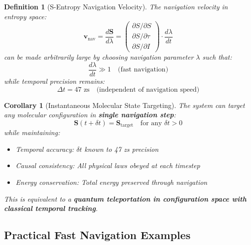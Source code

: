 \documentclass[12pt,a4paper]{article}
\newtheorem{definition}[theorem]{Definition}
\newtheorem{corollary}[theorem]{Corollary}
\begin{document}
\begin{definition}[S-Entropy Navigation Velocity]
The navigation velocity in entropy space:
\begin{equation}
\mathbf{v}_{\text{nav}} = \frac{d\mathbf{S}}{d\lambda} = \begin{pmatrix} \partial S/\partial S \\ \partial S/\partial \tau \\ \partial S/\partial I \end{pmatrix} \cdot \frac{d\lambda}{dt}
\end{equation}
can be made arbitrarily large by choosing navigation parameter $\lambda$ such that:
\begin{equation}
\frac{d\lambda}{dt} \gg 1 \quad \text{(fast navigation)}
\end{equation}
while temporal precision remains:
\begin{equation}
\Delta t = 47 \text{ zs} \quad \text{(independent of navigation speed)}
\end{equation}
\end{definition}

\begin{corollary}[Instantaneous Molecular State Targeting]
The system can target any molecular configuration in \textbf{single navigation step}:
\begin{equation}
\mathbf{S}(t + \delta t) = \mathbf{S}_{\text{target}} \quad \text{for any } \delta t > 0
\end{equation}
while maintaining:
\begin{itemize}
\item Temporal accuracy: $\delta t$ known to 47 zs precision
\item Causal consistency: All physical laws obeyed at each timestep
\item Energy conservation: Total energy preserved through navigation
\end{itemize}

This is equivalent to a \textbf{quantum teleportation in configuration space with classical temporal tracking}.
\end{corollary}

\subsection{Practical Fast Navigation Examples}
\end{document}
